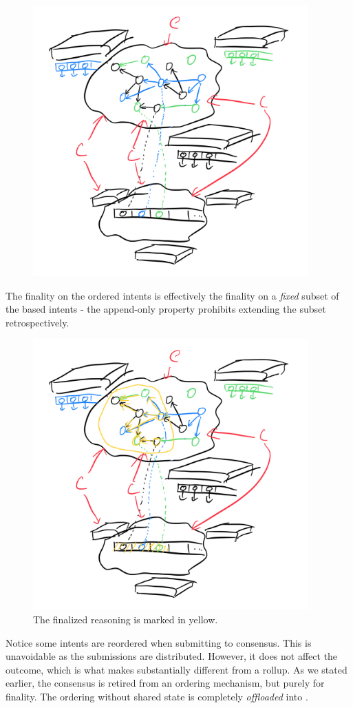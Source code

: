 \begin{figure}[H]
    \includegraphics[width=300pt]{graphs/IMG_0056}
    \Description{}
\end{figure}

The finality on the ordered intents is effectively the finality on a \emph{fixed} subset of the based intents - the append-only property prohibits extending the subset retrospectively.

\begin{figure}[H]
    \includegraphics[width=300pt]{graphs/IMG_0057}
    \caption{The finalized reasoning is marked in yellow.}
    \Description{}
\end{figure}

Notice some intents are reordered when submitting to consensus.
This is unavoidable as the submissions are distributed.
However, it does not affect the outcome, which is what makes \sys substantially different from a rollup.
As we stated earlier, the consensus is retired from an ordering mechanism, but purely for finality.
The ordering without shared state is completely \emph{offloaded} into \sys.